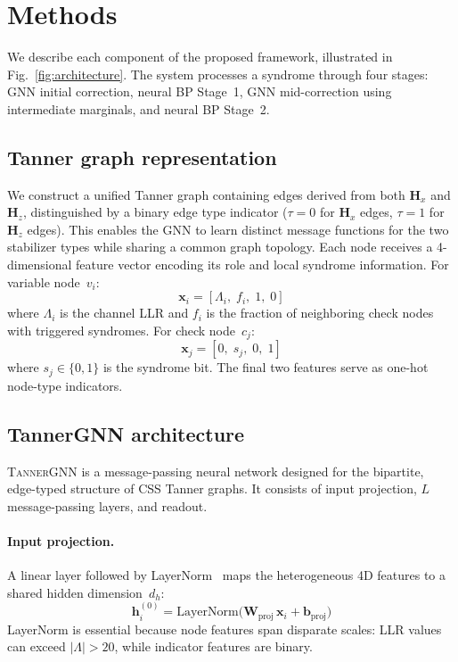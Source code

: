 \documentclass[a4paper,twocolumn,11pt,unpublished,nopdfoutputerror]{quantumarticle}
\newcommand{\llr}{\Lambda}
\newcommand{\Hmat}{\mathbf{H}}
\newcommand{\Wmat}{\mathbf{W}}
\newcommand{\bvec}[1]{\mathbf{#1}}
\begin{document}
\section{Methods}\label{sec:methods}

We describe each component of the proposed framework, illustrated in Fig.~\ref{fig:architecture}. The system processes a syndrome through four stages: GNN initial correction, neural BP Stage~1, GNN mid-correction using intermediate marginals, and neural BP Stage~2.

\subsection{Tanner graph representation}\label{sec:tanner}

We construct a unified Tanner graph containing edges derived from both $\Hmat_x$ and $\Hmat_z$, distinguished by a binary edge type indicator ($\tau = 0$ for $\Hmat_x$ edges, $\tau = 1$ for $\Hmat_z$ edges). This enables the GNN to learn distinct message functions for the two stabilizer types while sharing a common graph topology. Each node receives a 4-dimensional feature vector encoding its role and local syndrome information. For variable node~$v_i$:
\begin{equation}
\bvec{x}_i = [\llr_i,\; f_i,\; 1,\; 0]
\label{eq:varfeat}
\end{equation}
where $\llr_i$ is the channel LLR and $f_i$ is the fraction of neighboring check nodes with triggered syndromes. For check node~$c_j$:
\begin{equation}
\bvec{x}_j = [0,\; s_j,\; 0,\; 1]
\label{eq:chkfeat}
\end{equation}
where $s_j \in \{0,1\}$ is the syndrome bit. The final two features serve as one-hot node-type indicators.

\subsection{TannerGNN architecture}\label{sec:tannergnn}

\textsc{TannerGNN} is a message-passing neural network designed for the bipartite, edge-typed structure of CSS Tanner graphs. It consists of input projection, $L$ message-passing layers, and readout.

\paragraph{Input projection.} A linear layer followed by LayerNorm~\cite{Ba2016LayerNorm} maps the heterogeneous 4D features to a shared hidden dimension~$d_h$:
\begin{equation}
\bvec{h}_i^{(0)} = \mathrm{LayerNorm}\bigl(\Wmat_\mathrm{proj}\,\bvec{x}_i + \bvec{b}_\mathrm{proj}\bigr)
\label{eq:proj}
\end{equation}
LayerNorm is essential because node features span disparate scales: LLR values can exceed $|\llr| > 20$, while indicator features are binary.
\end{document}
